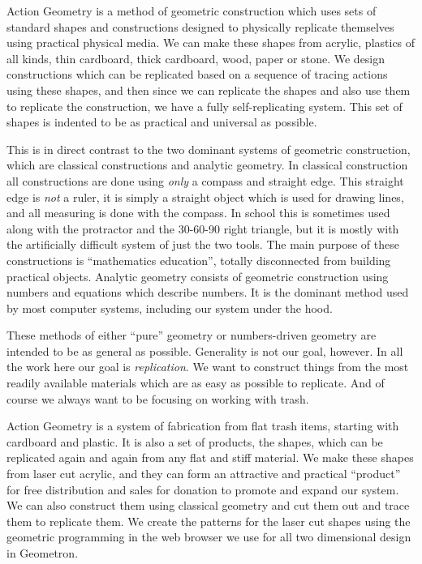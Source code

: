 
Action Geometry is a method of geometric construction which uses sets of
standard shapes and constructions designed to physically replicate
themselves using practical physical media. We can make these shapes from
acrylic, plastics of all kinds, thin cardboard, thick cardboard, wood,
paper or stone. We design constructions which can be replicated based on
a sequence of tracing actions using these shapes, and then since we can
replicate the shapes and also use them to replicate the construction, we
have a fully self-replicating system. This set of shapes is indented to
be as practical and universal as possible.

This is in direct contrast to the two dominant systems of geometric
construction, which are classical constructions and analytic geometry.
In classical construction all constructions are done using \emph{only} a
compass and straight edge. This straight edge is \emph{not} a ruler, it
is simply a straight object which is used for drawing lines, and all
measuring is done with the compass. In school this is sometimes used
along with the protractor and the 30-60-90 right triangle, but it is
mostly with the artificially difficult system of just the two tools. The
main purpose of these constructions is ``mathematics education'',
totally disconnected from building practical objects. Analytic geometry
consists of geometric construction using numbers and equations which
describe numbers. It is the dominant method used by most computer
systems, including our system under the hood.

These methods of either ``pure'' geometry or numbers-driven geometry are
intended to be as general as possible. Generality is not our goal,
however. In all the work here our goal is \emph{replication}. We want to
construct things from the most readily available materials which are as
easy as possible to replicate. And of course we always want to be
focusing on working with trash.

Action Geometry is a system of fabrication from flat trash items,
starting with cardboard and plastic. It is also a set of products, the
shapes, which can be replicated again and again from any flat and stiff
material. We make these shapes from laser cut acrylic, and they can form
an attractive and practical ``product'' for free distribution and sales
for donation to promote and expand our system. We can also construct
them using classical geometry and cut them out and trace them to
replicate them. We create the patterns for the laser cut shapes using
the geometric programming in the web browser we use for all two
dimensional design in Geometron.

